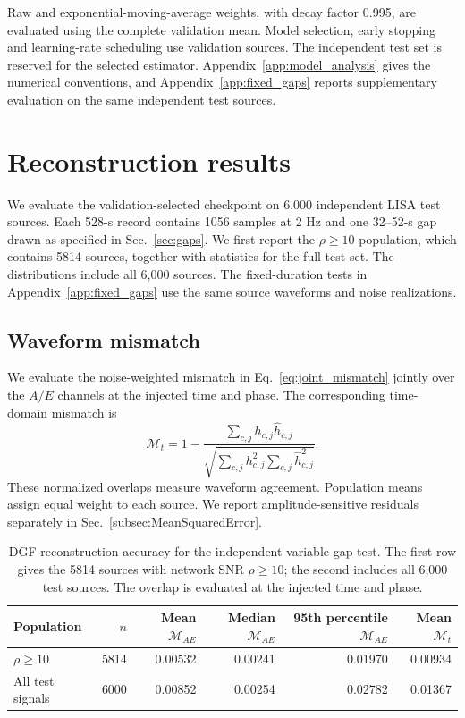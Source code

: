 \documentclass[10pt,prd,aps,a4paper,twocolumn,superscriptaddress,nofootinbib,floatfix]{revtex4-2}
\begin{document}
Raw and exponential-moving-average weights, with decay factor 0.995, are evaluated using the complete validation mean. Model selection, early stopping and learning-rate scheduling use validation sources. The independent test set is reserved for the selected estimator. Appendix~\ref{app:model_analysis} gives the numerical conventions, and Appendix~\ref{app:fixed_gaps} reports supplementary evaluation on the same independent test sources.

\section{Reconstruction results}\label{sec:results}
We evaluate the validation-selected checkpoint on 6,000 independent LISA test sources. Each 528-s record contains 1056 samples at 2 Hz and one 32--52-s gap drawn as specified in Sec.~\ref{sec:gaps}. We first report the $\rho\ge10$ population, which contains 5814 sources, together with statistics for the full test set. The distributions include all 6,000 sources. The fixed-duration tests in Appendix~\ref{app:fixed_gaps} use the same source waveforms and noise realizations.

\subsection{Waveform mismatch}\label{subsec:Mismatch}
We evaluate the noise-weighted mismatch in Eq.~\eqref{eq:joint_mismatch} jointly over the $A/E$ channels at the injected time and phase. The corresponding time-domain mismatch is
\begin{equation}
\mathcal M_t=1-\frac{\sum_{c,j}h_{c,j}\widehat h_{c,j}}{\sqrt{\sum_{c,j}h_{c,j}^2\sum_{c,j}\widehat h_{c,j}^2}}.
\end{equation}
These normalized overlaps measure waveform agreement. Population means assign equal weight to each source. We report amplitude-sensitive residuals separately in Sec.~\ref{subsec:MeanSquaredError}.

\begin{table}[t]\centering
\caption{DGF reconstruction accuracy for the independent variable-gap test. The first row gives the 5814 sources with network SNR $\rho\ge10$; the second includes all 6,000 test sources. The overlap is evaluated at the injected time and phase.}\label{tab:results}
\begin{tabular}{lrrrrr}\hline\hline
Population & $n$ & Mean $\mathcal M_{AE}$ & Median $\mathcal M_{AE}$ & 95th percentile $\mathcal M_{AE}$ & Mean $\mathcal M_t$\\\hline
$\rho\ge10$ & 5814 & 0.00532 & 0.00241 & 0.01970 & 0.00934 \\
All test signals & 6000 & 0.00852 & 0.00254 & 0.02782 & 0.01367 \\
\hline\hline\end{tabular}\end{table}
\end{document}
